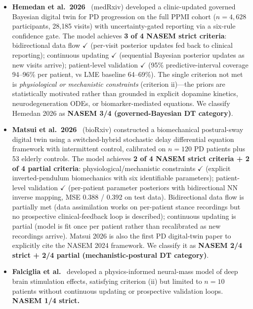 \begin{itemize}
    \item \textbf{Hemedan et al.\ 2026}~\cite{hemedan2026} (medRxiv) developed a clinic-updated governed Bayesian digital twin for PD progression on the full PPMI cohort ($n=4{,}628$ participants, 28{,}185 visits) with uncertainty-gated reporting via a six-rule confidence gate. The model achieves \textbf{3 of 4 NASEM strict criteria}: bidirectional data flow $\checkmark$ (per-visit posterior updates fed back to clinical reporting); continuous updating $\checkmark$ (sequential Bayesian posterior updates as new visits arrive); patient-level validation $\checkmark$ (95\% predictive-interval coverage 94--96\% per patient, vs LME baseline 64--69\%). The single criterion not met is \emph{physiological or mechanistic constraints} (criterion ii)---the priors are statistically motivated rather than grounded in explicit dopamine kinetics, neurodegeneration ODEs, or biomarker-mediated equations. We classify Hemedan 2026 as \textbf{NASEM 3/4 (governed-Bayesian DT category)}.

    \item \textbf{Matsui et al.\ 2026}~\cite{matsui2026stance} (bioRxiv) constructed a biomechanical postural-sway digital twin using a switched-hybrid stochastic delay differential equation framework with intermittent control, calibrated on $n=120$ PD patients plus 53 elderly controls. The model achieves \textbf{2 of 4 NASEM strict criteria + 2 of 4 partial criteria}: physiological/mechanistic constraints $\checkmark$ (explicit inverted-pendulum biomechanics with six identifiable parameters); patient-level validation $\checkmark$ (per-patient parameter posteriors with bidirectional NN inverse mapping, MSE 0.388 / 0.392 on test data). Bidirectional data flow is partially met (data assimilation works on per-patient stance recordings but no prospective clinical-feedback loop is described); continuous updating is partial (model is fit once per patient rather than recalibrated as new recordings arrive). Matsui 2026 is also the first PD digital-twin paper to explicitly cite the NASEM 2024 framework. We classify it as \textbf{NASEM 2/4 strict + 2/4 partial (mechanistic-postural DT category)}.

    \item \textbf{Falciglia et al.}~\cite{falciglia2025} developed a physics-informed neural-mass model of deep brain stimulation effects, satisfying criterion (ii) but limited to $n=10$ patients without continuous updating or prospective validation loops. \textbf{NASEM 1/4 strict.}


\end{itemize}

